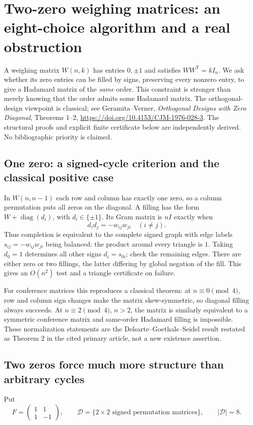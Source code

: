 \documentclass[11pt]{article}
\begin{document}
\section{Two-zero weighing matrices: an eight-choice algorithm and a real obstruction}
\label{sec:weighing-fill}

A weighing matrix $W(n,k)$ has entries $0,\pm1$ and satisfies
$WW^{\mathsf T}=kI_n$. We ask whether its zero entries can be
filled by signs, preserving every nonzero entry, to give a Hadamard
matrix of the \emph{same} order. This constraint is stronger than
merely knowing that the order admits some Hadamard matrix.
The orthogonal-design viewpoint is classical; see Geramita--Verner,
\emph{Orthogonal Designs with Zero Diagonal}, Theorems 1--2,
\url{https://doi.org/10.4153/CJM-1976-028-3}.
The structural proofs and explicit finite certificate below are
independently derived. No bibliographic priority is claimed.

\subsection{One zero: a signed-cycle criterion and the classical positive case}
In $W(n,n-1)$ each row and column has exactly one zero, so a column
permutation puts all zeros on the diagonal. A filling has the form
$W+\operatorname{diag}(d_i)$, with $d_i\in\{\pm1\}$. Its Gram
matrix is $nI$ exactly when
\[
 d_id_j=-w_{ij}w_{ji}\quad(i\ne j).
\]
Thus completion is equivalent to the complete signed graph with edge
labels $s_{ij}=-w_{ij}w_{ji}$ being balanced: the product around every
triangle is $1$. Taking $d_0=1$ determines all other signs
$d_i=s_{0i}$; check the remaining edges. There are either zero or
two fillings, the latter differing by global negation of the fill.
This gives an $O(n^2)$ test and a triangle certificate on failure.

For conference matrices this reproduces a classical theorem:
at $n\equiv0\pmod4$, row and column sign changes make the matrix
skew-symmetric, so diagonal filling always succeeds. At
$n\equiv2\pmod4$, $n>2$, the matrix is similarly equivalent to a
symmetric conference matrix and same-order Hadamard filling is
impossible. These normalization statements are the
Delsarte--Goethals--Seidel result restated as Theorem 2 in the cited
primary article, not a new existence assertion.

\subsection{Two zeros force much more structure than arbitrary cycles}
Put
\[
 F=\begin{pmatrix}1&1\\1&-1\end{pmatrix},\qquad
 \mathcal D=\{2\times2\text{ signed permutation matrices}\},
 \qquad|\mathcal D|=8.
\]
\end{document}
